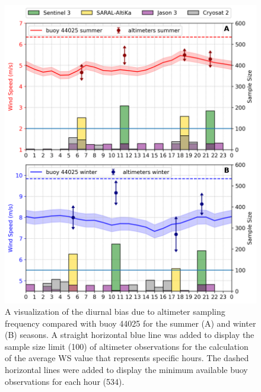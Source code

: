 \begin{figure}[H]
\centering
\includegraphics[width=0.75\linewidth]{Figures/Chapter5/alt_buoy44025_2019_diur_bias4.png}
\caption{A visualization of the diurnal bias due to altimeter sampling frequency compared with buoy 44025 for the summer (A) and winter (B) seasons. A straight horizontal blue line was added to display the sample size limit (100) of altimeter observations for the calculation of the average WS value that represents specific hours. The dashed horizontal lines were added to display the minimum available buoy observations for each hour (534).}
\label{fig:diurnal_bias_wind2019}
\end{figure}




